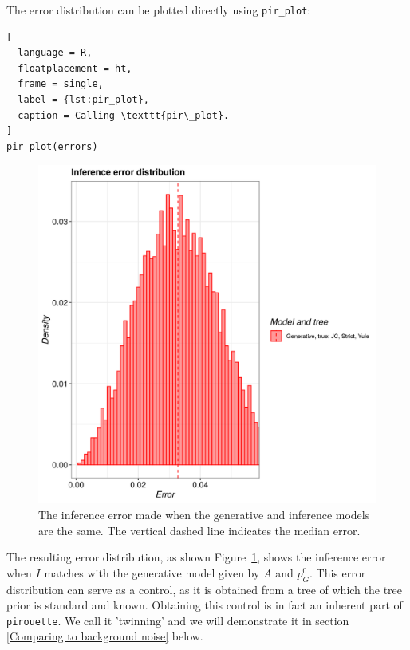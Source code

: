 The error distribution can be plotted directly using \verb;pir_plot;:

\begin{lstlisting}[
  language = R,
  floatplacement = ht,
  frame = single,
  label = {lst:pir_plot},
  caption = Calling \texttt{pir\_plot}.
]
pir_plot(errors)
\end{lstlisting}

\begin{figure}[H]
  \includegraphics[width=\textwidth]{example_1/errors.png}
  \caption{
    The inference error made 
    when the generative and inference models are the same.
    The vertical dashed line indicates the median error.
  }
  \label{fig:example_1}
\end{figure}

The resulting error distribution, as shown Figure~\ref{fig:example_1},
shows the inference error 
when $\mathit{I}$ matches with the generative model given 
by $\mathit{A}$ and $\mathit{p_{G}^0}$.
This error distribution can serve as a control,
as it is obtained from a tree of which the tree prior is standard and known.
Obtaining this control is in fact an inherent part of \verb;pirouette;. 
We call it 'twinning' and we will demonstrate it in section
\ref{Comparing to background noise} below.

